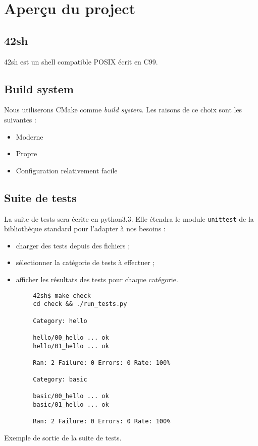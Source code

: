 \section{Aperçu du project}

\subsection{42sh}

42sh est un shell compatible POSIX écrit en C99.

\subsection{Build system}

Nous utiliserons CMake comme \emph{build system}. Les raisons de ce choix
sont les suivantes :
\begin{itemize}
    \item Moderne
    \item Propre
    \item Configuration relativement facile
\end{itemize}

\subsection{Suite de tests}

La suite de tests sera écrite en python3.3. Elle étendra le module
\texttt{unittest} de la bibliothèque standard pour l'adapter à nos besoins :

\begin{itemize}
    \item charger des tests depuis des fichiers ;
    \item sélectionner la catégorie de tests à effectuer ;
    \item afficher les résultats des tests pour chaque catégorie.
\end{itemize}

\begin{listing}[H]
    \begin{verbatim}
        42sh$ make check
        cd check && ./run_tests.py

        Category: hello

        hello/00_hello ... ok
        hello/01_hello ... ok

        Ran: 2 Failure: 0 Errors: 0 Rate: 100%

        Category: basic

        basic/00_hello ... ok
        basic/01_hello ... ok

        Ran: 2 Failure: 0 Errors: 0 Rate: 100%
    \end{verbatim}
    \caption{Exemple de sortie de la suite de tests.}
\end{listing}


